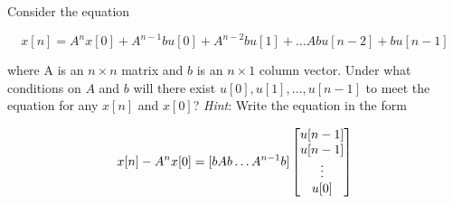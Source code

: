 \item [3.11] Consider the equation

\begin{equation*}
 x[n] = A^n x[0] + A^{n-1} b u[0]+ A^{n-2} b u[1]+ \dots A b u[n-2]+ b u[n-1]
\end{equation*}

where A is an $n \times n$ matrix and $b$ is an $n \times 1$ column vector.
Under what conditions on $A$ and $b$ will there exist $u[0], u[1], \dots, u[n-1]$ to meet the equation for any $x[n]$ and $x[0]$?
\emph{Hint}: Write the equation in the form

\begin{equation*}
 x[n] - A^n x[0] = [b \/ Ab \/ \dots A^{n-1}b]
 \begin{bmatrix}
 u[n-1]\\
 u[n-1]\\
 \vdots \\
 u[0]\\
\end{bmatrix}
\end{equation*}
